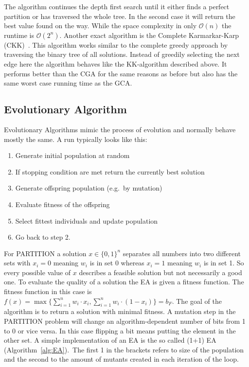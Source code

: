 The algorithm continues the depth first search until it either finds a perfect partition or has traversed the whole tree.
In the second case it will return the best value found on the way.
While the space complexity in only $\mathcal{O}(n)$ the runtime is $\mathcal{O}(2^n)$.
Another exact algorithm is the Complete Karmarkar-Karp (CKK)~\cite{korf1998complete}.
This algorithm works similar to the complete greedy approach by traversing the binary tree of all solutions.
Instead of greedily selecting the next edge here the algorithm behaves like the KK-algorithm described above.
It performs better than the CGA for the same reasons as before but also has the same worst case running time as the GCA.

\subsection{Evolutionary Algorithm}
Evolutionary Algorithms mimic the process of evolution and normally behave mostly the same.
A run typically looks like this:
\begin{enumerate}
      \item Generate initial population at random
      \item If stopping condition are met return the currently best solution
      \item Generate offspring population (e.g.\ by mutation)
      \item Evaluate fitness of the offspring
      \item Select fittest individuals and update population
      \item Go back to step 2.
\end{enumerate}
For PARTITION a solution $x\in{\{0,1\}}^{n}$ separates all numbers into two different sets with $x_i=0$ meaning $w_i$ is in set 0 whereas $x_i=1$ meaning $w_i$ is in set 1.
So every possible value of $x$ describes a feasible solution but not necessarily a good one.
To evaluate the quality of a solution the EA is given a fitness function.
The fitness function in this case is \(f(x)=\max\{\sum_{i=1}^{n}w_i\cdot x_i, \sum_{i=1}^{n}w_i\cdot(1-x_i)\}=b_F\).
The goal of the algorithm is to return a solution with minimal fitness.
A mutation step in the PARTITION problem will change an algorithm-dependent number of bits from 1 to 0 or vice versa.
In this case flipping a bit means putting the element in the other set.
A simple implementation of an EA is the so called (1+1) EA (Algorithm~\ref{alg:EA}).\
The first 1 in the brackets refers to size of the population and the second to the amount of mutants created in each iteration of the loop.
